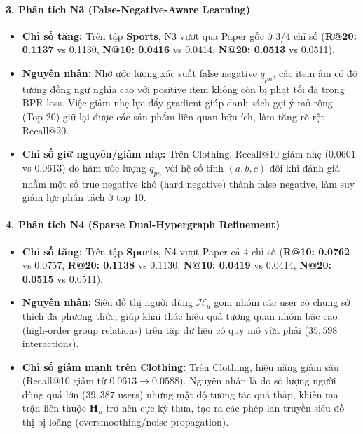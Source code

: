 \paragraph{3. Phân tích N3 (False-Negative-Aware Learning)}
\begin{itemize}[leftmargin=*]
  \item \textbf{Chỉ số tăng:} Trên tập \textbf{Sports}, N3 vượt qua Paper gốc ở 3/4 chỉ số (\textbf{R@20: 0.1137} vs 0.1130, \textbf{N@10: 0.0416} vs 0.0414, \textbf{N@20: 0.0513} vs 0.0511).
  \item \textbf{Nguyên nhân:} Nhờ ước lượng xác suất false negative $q_{pn}$, các item âm có độ tương đồng ngữ nghĩa cao với positive item không còn bị phạt tối đa trong BPR loss. Việc giảm nhẹ lực đẩy gradient giúp danh sách gợi ý mở rộng (Top-20) giữ lại được các sản phẩm liên quan hữu ích, làm tăng rõ rệt Recall@20.
  \item \textbf{Chỉ số giữ nguyên/giảm nhẹ:} Trên Clothing, Recall@10 giảm nhẹ ($0.0601$ vs $0.0613$) do hàm ước lượng $q_{pn}$ với hệ số tĩnh $(a, b, c)$ đôi khi đánh giá nhầm một số true negative khó (hard negative) thành false negative, làm suy giảm lực phân tách ở top 10.
\end{itemize}

\paragraph{4. Phân tích N4 (Sparse Dual-Hypergraph Refinement)}
\begin{itemize}[leftmargin=*]
  \item \textbf{Chỉ số tăng:} Trên tập \textbf{Sports}, N4 vượt Paper cả 4 chỉ số (\textbf{R@10: 0.0762} vs 0.0757, \textbf{R@20: 0.1138} vs 0.1130, \textbf{N@10: 0.0419} vs 0.0414, \textbf{N@20: 0.0515} vs 0.0511).
  \item \textbf{Nguyên nhân:} Siêu đồ thị người dùng $\mathcal{H}_u$ gom nhóm các user có chung sở thích đa phương thức, giúp khai thác hiệu quả tương quan nhóm bậc cao (high-order group relations) trên tập dữ liệu có quy mô vừa phải ($35{,}598$ interactions).
  \item \textbf{Chỉ số giảm mạnh trên Clothing:} Trên Clothing, hiệu năng giảm sâu (Recall@10 giảm từ $0.0613 \to 0.0588$). Nguyên nhân là do số lượng người dùng quá lớn ($39{,}387$ users) nhưng mật độ tương tác quá thấp, khiến ma trận liên thuộc $\mathbf{H}_u$ trở nên cực kỳ thưa, tạo ra các phép lan truyền siêu đồ thị bị loãng (oversmoothing/noise propagation).
\end{itemize}

